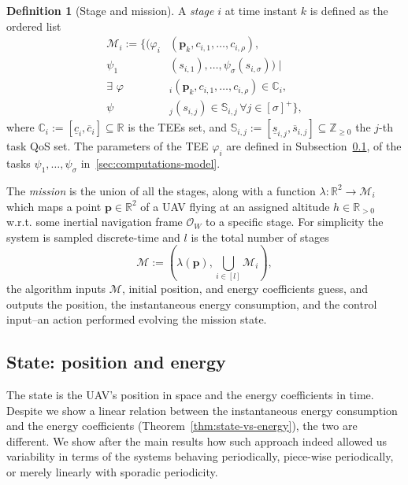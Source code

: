 \documentclass[letterpaper,10pt,conference]{ieeeconf}
\theoremstyle{definition}
\newtheorem{defn}{Definition}[section]
\begin{document}
\begin{defn}[Stage and mission]\label{def:mission}
  A \emph{stage} $i$ at time instant $k$ is defined as the ordered list
  \begin{equation}\label{eq:mission}\begin{split}
    \mathcal{M}_i:=\{(\varphi_i&(\mathbf{p}_k,c_{i,1},\dots,c_{i,\rho}),\\
      \psi_1&(s_{i,1}),\dots,\psi_\sigma(s_{i,\sigma}))\mid\\
      \exists\,\,\varphi&_i(\mathbf{p}_k,c_{i,1},\dots,c_{i,\rho})\in\mathbb{C}_i,\,\\
      \psi&_j(s_{i,j})\in\mathbb{S}_{i,j}\,\forall j\in[\sigma]^+\},
  \end{split}\end{equation}
  where $\mathbb{C}_i:=[\underline{c}_i,\overline{c}_i]\subseteq\mathbb{R}$ is the TEEs set, and $\mathbb{S}_{i,j}:=[\underline{s}_{i,j},\overline{s}_{i,j}]\subseteq\mathbb{Z}_{\geq 0}$ the $j$-th task QoS set. The parameters of the TEE $\varphi_i$ are defined in Subsection~\ref{sec:model}, of the tasks $\psi_1,\dots,\psi_\sigma$ in~\ref{sec:computations-model}.

  The \emph{mission} is the union of all the stages, along with a function $\lambda:\mathbb{R}^2\rightarrow\mathcal{M}_i$ which maps a point $\mathbf{p}\in\mathbb{R}^2$ of a UAV flying at an assigned altitude $h\in\mathbb{R}_{>0}$ w.r.t. some inertial navigation frame $\mathcal{O}_W$ to a specific stage. For simplicity the system is sampled discrete-time and $l$ is the total number of stages
  \begin{equation}
    \mathcal{M}:=(\lambda(\mathbf{p}),\bigcup_{i\in[l]}{\mathcal{M}_i}),
  \end{equation}
  the algorithm inputs $\mathcal{M}$, initial position, and energy coefficients guess, and outputs the position, the instantaneous energy consumption, and the control input--an action performed evolving the mission state.
\end{defn}

\subsection{State: position and energy}
\label{sec:model}

The state is the UAV's position in space and the energy coefficients in time. Despite we show a linear relation between the instantaneous energy consumption and the energy coefficients (Theorem~\ref{thm:state-vs-energy}), the two are different. We show after the main results how such approach indeed allowed us variability in terms of the systems behaving periodically, piece-wise periodically, or merely linearly with sporadic periodicity.
\end{document}
